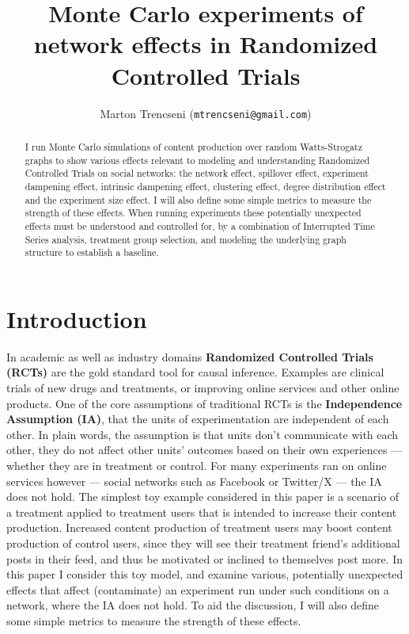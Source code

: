 \documentclass[final,5p,times,twocolumn,authoryear]{elsarticle}
\begin{document}
\begin{frontmatter}

\title{Monte Carlo experiments of network effects in Randomized Controlled Trials}

\author{Marton Trencseni (\texttt{mtrencseni@gmail.com})}

\begin{abstract}
I run Monte Carlo simulations of content production over random Watts-Strogatz graphs to show various effects relevant to modeling and understanding Randomized Controlled Trials on social networks: the network effect, spillover effect, experiment dampening effect, intrinsic dampening effect, clustering effect, degree distribution effect and the experiment size effect. I will also define some simple metrics to measure the strength of these effects. When running experiments these potentially unexpected effects must be understood and controlled for, by a combination of Interrupted Time Series analysis, treatment group selection, and modeling the underlying graph structure to establish a baseline.
 
\end{abstract}

\end{frontmatter}

\section{Introduction}

In academic as well as industry domains \textbf{Randomized Controlled Trials (RCTs)} are the gold standard tool for causal inference. Examples are clinical trials of new drugs and treatments, or improving online services and other online products. One of the core assumptions of traditional RCTs is the \textbf{Independence Assumption (IA)}, that the units of experimentation are independent of each other. In plain words, the assumption is that units don't communicate with each other, they do not affect other units' outcomes based on their own experiences --- whether they are in treatment or control. For many experiments ran on online services however --- social networks such as Facebook or Twitter/X --- the IA does not hold. The simplest toy example considered in this paper is a scenario of a treatment applied to treatment users that is intended to increase their content production. Increased content production of treatment users may boost content production of control users, since they will see their treatment friend's additional posts in their feed, and thus be motivated or inclined to themselves post more. In this paper I consider this toy model, and examine various, potentially unexpected effects that affect (contaminate) an experiment run under such conditions on a network, where the IA does not hold. To aid the discussion, I will also define some simple metrics to measure the strength of these effects.
\end{document}
